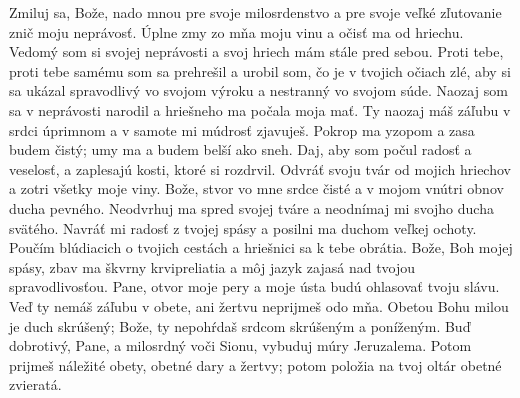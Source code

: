 Zmiluj sa, Bože, nado mnou pre svoje milosrdenstvo
a pre svoje veľké zľutovanie znič moju neprávosť.
Úplne zmy zo mňa moju vinu
a očisť ma od hriechu.
\versseparator
Vedomý som si svojej neprávosti
a svoj hriech mám stále pred sebou.
\versseparator
Proti tebe, proti tebe samému som sa prehrešil
a urobil som, čo je v tvojich očiach zlé,
aby si sa ukázal spravodlivý vo svojom výroku
a nestranný vo svojom súde.
\versseparator
Naozaj som sa v neprávosti narodil
a hriešneho ma počala moja mať.
Ty naozaj máš záľubu v srdci úprimnom
a v samote mi múdrosť zjavuješ.
\versseparator
Pokrop ma yzopom a zasa budem čistý;
umy ma a budem belší ako sneh.
Daj, aby som počul radosť a veselosť,
a zaplesajú kosti, ktoré si rozdrvil.
\versseparator
Odvráť svoju tvár od mojich hriechov
a zotri všetky moje viny.
Bože, stvor vo mne srdce čisté
a v mojom vnútri obnov ducha pevného.
\versseparator
Neodvrhuj ma spred svojej tváre
a neodnímaj mi svojho ducha svätého.
Navráť mi radosť z tvojej spásy
a posilni ma duchom veľkej ochoty.
\versseparator
Poučím blúdiacich o tvojich cestách
a hriešnici sa k tebe obrátia.
Bože, Boh mojej spásy, zbav ma škvrny krvipreliatia
a môj jazyk zajasá nad tvojou spravodlivosťou.
\versseparator
Pane, otvor moje pery
a moje ústa budú ohlasovať tvoju slávu.
Veď ty nemáš záľubu v obete,
ani žertvu neprijmeš odo mňa.
Obetou Bohu milou je duch skrúšený;
Bože, ty nepohŕdaš srdcom skrúšeným a poníženým.
\versseparator
Buď dobrotivý, Pane, a milosrdný voči Sionu,
vybuduj múry Jeruzalema.
Potom prijmeš náležité obety, obetné dary a žertvy;
potom položia na tvoj oltár obetné zvieratá. 
